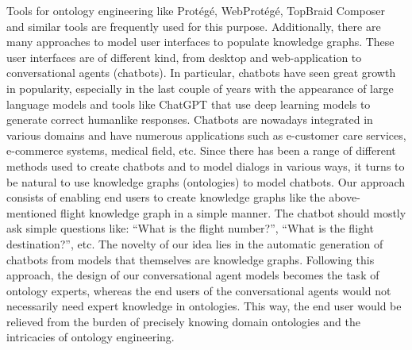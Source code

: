 \documentclass[runningheads]{llncs}
\begin{document}
Tools for ontology engineering like Protégé, WebProtégé, TopBraid Composer and similar tools are frequently used for this purpose. Additionally, there are many approaches to model user interfaces to populate knowledge graphs. These user interfaces are of different kind, from desktop and web-application to conversational agents (chatbots). In particular, chatbots have seen great growth in popularity, especially in the last couple of years with the appearance of large language models and tools like ChatGPT that use deep learning models to generate correct humanlike responses. Chatbots are nowadays integrated in various domains and have numerous applications such as e-customer care services, e-commerce systems, medical field, etc. Since there has been a range of different methods used to create chatbots and to model dialogs in various ways, it turns to be natural to use knowledge graphs (ontologies) to model chatbots. Our approach consists of enabling end users to create knowledge graphs like the above-mentioned flight knowledge graph in a simple manner. The chatbot should mostly ask simple questions like: ``What is the flight number?'', ``What is the flight destination?'', etc. The novelty of our idea lies in the automatic generation of chatbots from models that themselves are knowledge graphs. Following this approach, the design of our conversational agent models becomes the task of ontology experts, whereas the end users of the conversational agents would not necessarily need expert knowledge in ontologies. This way, the end user would be relieved from the burden of precisely knowing domain ontologies and the intricacies of ontology engineering.
\end{document}
